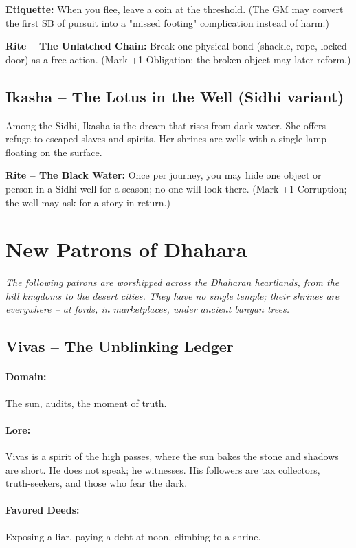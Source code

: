 \documentclass[11pt]{book}
\begin{document}
\textbf{Etiquette:} When you flee, leave a coin at the threshold. (The GM may convert the first SB of pursuit into a "missed footing" complication instead of harm.)

\textbf{Rite -- The Unlatched Chain:} Break one physical bond (shackle, rope, locked door) as a free action. (Mark +1 Obligation; the broken object may later reform.)

\subsection{Ikasha -- The Lotus in the Well (Sidhi variant)}
Among the Sidhi, Ikasha is the dream that rises from dark water. She offers refuge to escaped slaves and spirits. Her shrines are wells with a single lamp floating on the surface.

\textbf{Rite -- The Black Water:} Once per journey, you may hide one object or person in a Sidhi well for a season; no one will look there. (Mark +1 Corruption; the well may ask for a story in return.)

\section{New Patrons of Dhahara}
\emph{The following patrons are worshipped across the Dhaharan heartlands, from the hill kingdoms to the desert cities. They have no single temple; their shrines are everywhere -- at fords, in marketplaces, under ancient banyan trees.}

\subsection{Vivas -- The Unblinking Ledger}
\paragraph{Domain:} The sun, audits, the moment of truth.
\paragraph{Lore:} Vivas is a spirit of the high passes, where the sun bakes the stone and shadows are short. He does not speak; he witnesses. His followers are tax collectors, truth‑seekers, and those who fear the dark.
\paragraph{Favored Deeds:} Exposing a liar, paying a debt at noon, climbing to a shrine.
\end{document}
